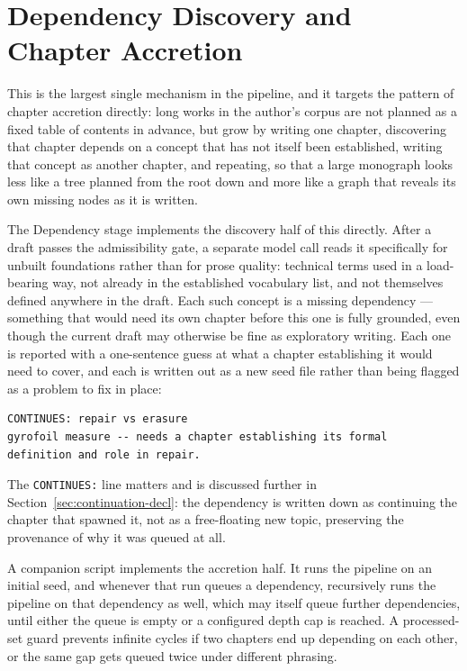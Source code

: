 \documentclass[11pt]{article}
\theoremstyle{definition}
\begin{document}
\section{Dependency Discovery and Chapter Accretion}
\label{sec:accretion}

This is the largest single mechanism in the pipeline, and it targets
the pattern of chapter accretion directly: long works in the author's
corpus are not planned as a fixed table of contents in advance, but
grow by writing one chapter, discovering that chapter depends on a
concept that has not itself been established, writing that concept as
another chapter, and repeating, so that a large monograph looks less
like a tree planned from the root down and more like a graph that
reveals its own missing nodes as it is written.

The Dependency stage implements the discovery half of this directly.
After a draft passes the admissibility gate, a separate model call
reads it specifically for unbuilt foundations rather than for prose
quality: technical terms used in a load-bearing way, not already in the
established vocabulary list, and not themselves defined anywhere in the
draft. Each such concept is a missing dependency --- something that
would need its own chapter before this one is fully grounded, even
though the current draft may otherwise be fine as exploratory writing.
Each one is reported with a one-sentence guess at what a chapter
establishing it would need to cover, and each is written out as a new
seed file rather than being flagged as a problem to fix in place:

\begin{lstlisting}[caption={A queued dependency seed file}]
CONTINUES: repair vs erasure
gyrofoil measure -- needs a chapter establishing its formal
definition and role in repair.
\end{lstlisting}

The \texttt{CONTINUES:} line matters and is discussed further in
Section~\ref{sec:continuation-decl}: the dependency is written down as
continuing the chapter that spawned it, not as a free-floating new
topic, preserving the provenance of why it was queued at all.

A companion script implements the accretion half. It runs the pipeline
on an initial seed, and whenever that run queues a dependency,
recursively runs the pipeline on that dependency as well, which may
itself queue further dependencies, until either the queue is empty or a
configured depth cap is reached. A processed-set guard prevents
infinite cycles if two chapters end up depending on each other, or the
same gap gets queued twice under different phrasing.
\end{document}
